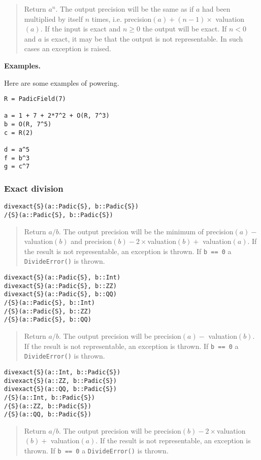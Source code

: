 \documentclass[a4paper,10pt]{article}
\newcommand{\code}{\lstinline}
\newcommand{\desc}[1]{\vspace{-3mm}\begin{quote}#1\end{quote}}
\begin{document}
{{\desc{Return $a^n$. The output precision will be the same as if $a$ had been
multiplied by itself $n$ times, i.e. precision$(a) + (n - 1)\times$
valuation$(a)$. If the input is exact and $n \geq 0$ the output will be
exact. If $n < 0$ and $a$ is exact, it may be that the output is not
representable. In such cases an exception is raised.}

\textbf{Examples.}

Here are some examples of powering.

\begin{lstlisting}
R = PadicField(7)

a = 1 + 7 + 2*7^2 + O(R, 7^3)
b = O(R, 7^5)
c = R(2)

d = a^5
f = b^3
g = c^7
\end{lstlisting}

\subsubsection{Exact division}

\begin{lstlisting}
divexact{S}(a::Padic{S}, b::Padic{S})
/{S}(a::Padic{S}, b::Padic{S})
\end{lstlisting}

\desc{Return $a/b$. The output precision will be the minimum of 
precision$(a) -$ valuation$(b)$ and precision$(b) - 2\times$valuation$(b) +$
valuation$(a)$. If the result is not representable, an exception is
thrown. If \code{b == 0} a \code{DivideError()} is thrown.}

\begin{lstlisting}
divexact{S}(a::Padic{S}, b::Int)
divexact{S}(a::Padic{S}, b::ZZ)
divexact{S}(a::Padic{S}, b::QQ)
/{S}(a::Padic{S}, b::Int)
/{S}(a::Padic{S}, b::ZZ)
/{S}(a::Padic{S}, b::QQ)
\end{lstlisting}

\desc{Return $a/b$. The output precision will be precision$(a) -$ 
valuation$(b)$. If the result is not representable, an exception is
thrown. If \code{b == 0} a \code{DivideError()} is thrown.}

\begin{lstlisting}
divexact{S}(a::Int, b::Padic{S})
divexact{S}(a::ZZ, b::Padic{S})
divexact{S}(a::QQ, b::Padic{S})
/{S}(a::Int, b::Padic{S})
/{S}(a::ZZ, b::Padic{S})
/{S}(a::QQ, b::Padic{S})
\end{lstlisting}

\desc{Return $a/b$. The output precision will be 
precision$(b) - 2\times$valuation$(b) +$ valuation$(a)$. If the result is not
representable, an exception is thrown. If \code{b == 0} a \code{DivideError()}
is thrown.}

}}
\end{document}
